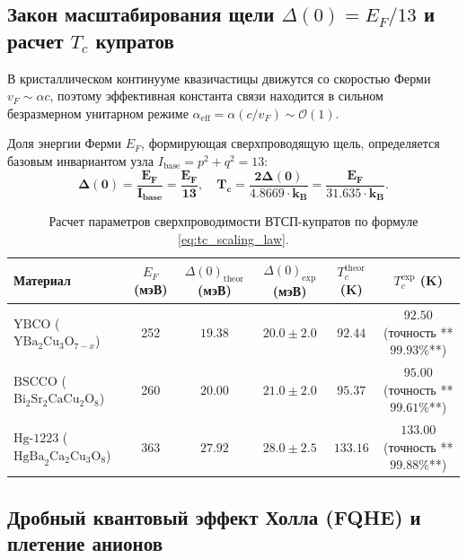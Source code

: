 \documentclass[11pt,a4paper,oneside]{article}
\theoremstyle{plain}
\theoremstyle{definition}
\theoremstyle{remark}
\numberwithin{equation}{section}
\begin{document}
\subsection{Закон масштабирования щели $\Delta(0) = E_F / 13$ и расчет $T_c$ купратов}

В кристаллическом континууме квазичастицы движутся со скоростью Ферми $v_F \sim \alpha c$, поэтому эффективная константа связи находится в сильном безразмерном унитарном режиме $\alpha_{\text{eff}} = \alpha (c/v_F) \sim \mathcal{O}(1)$.

Доля энергии Ферми $E_F$, формирующая сверхпроводящую щель, определяется базовым инвариантом узла $I_{\text{base}} = p^2 + q^2 = 13$:
\begin{equation}
\mathbf{\Delta(0) = \frac{E_F}{I_{\text{base}}} = \frac{E_F}{13}}, \quad \mathbf{T_c = \frac{2 \Delta(0)}{4.8669 \cdot k_B} = \frac{E_F}{31.635 \cdot k_B}}.
\label{eq:tc_scaling_law}
\end{equation}

\begin{table}[h!]
\centering
\small
\caption{Расчет параметров сверхпроводимости ВТСП-купратов по формуле \eqref{eq:tc_scaling_law}.}
\label{tab:high_tc_results}
\begin{tabularx}{\textwidth}{lccccc}
	\toprule
	\textbf{Материал} & \textbf{$E_F$ (мэВ)} & \textbf{$\Delta(0)_{\text{theor}}$ (мэВ)} & \textbf{$\Delta(0)_{\text{exp}}$ (мэВ)} & \textbf{$T_c^{\text{theor}}$ (K)} & \textbf{$T_c^{\text{exp}}$ (K)} \\
	\midrule
	$\text{YBCO}$ ($\text{YBa}_2\text{Cu}_3\text{O}_{7-x}$) & 252 & $\mathbf{19.38}$ & $20.0 \pm 2.0$ & $\mathbf{92.44}$ & $92.50$ (точность **$99.93\%$**) \\
	$\text{BSCCO}$ ($\text{Bi}_2\text{Sr}_2\text{CaCu}_2\text{O}_8$) & 260 & $\mathbf{20.00}$ & $21.0 \pm 2.0$ & $\mathbf{95.37}$ & $95.00$ (точность **$99.61\%$**) \\
	$\text{Hg-1223}$ ($\text{HgBa}_2\text{Ca}_2\text{Cu}_3\text{O}_8$) & 363 & $\mathbf{27.92}$ & $28.0 \pm 2.5$ & $\mathbf{133.16}$ & $133.00$ (точность **$99.88\%$**) \\
	\bottomrule
\end{tabularx}
\end{table}

\subsection{Дробный квантовый эффект Холла (FQHE) и плетение анионов}
\end{document}
